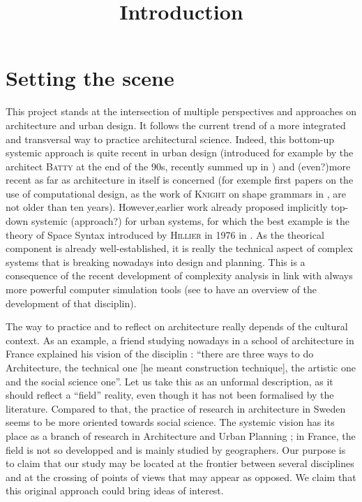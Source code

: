 \documentclass[english]{article}
\date{}
\newcommand{\noun}[1]{\textsc{#1}}
\begin{document}
\title{Introduction}

\maketitle

\section{Setting the scene}

This project stands at the intersection of multiple perspectives
and approaches on architecture and urban design. It follows 
the current trend of a more integrated and transversal way to practice
architectural science. Indeed, this bottom-up systemic approach is
quite recent in urban design (introduced for example by the architect
\noun{Batty} at the end of the 90s, recently summed up in \cite{Bat07})
and (even?)more recent as far as architecture in itself is concerned (for exemple first papers
on the use of computational design, as the work of \noun{Knight} on
shape grammars in \cite{knight2003computing}, are not older than
ten years). However,earlier work already proposed implicitly top-down
systemic (approach?) for urban systems, for which the best example is the theory
of Space Syntax introduced by \noun{Hillier} in 1976 in \cite{hillier1976space}.
As the theorical component is already well-established, it is really the technical
aspect of complex systems that is breaking nowadays into design and
planning. This is a consequence of the recent development of complexity
analysis in link with always more powerful computer
simulation tools (see \cite{chavalarias2009french} to have an overview
of the development of that disciplin).

\bigskip{}


The way to practice and to reflect on architecture really depends of the
cultural context. As an example, a friend studying nowadays in a school
of architecture in France explained his vision of the disciplin :
``there are three ways to do Architecture, the technical one {[}he
meant construction technique{]}, the artistic one and the social science
one''. Let us take this as an unformal description, as it should
reflect a ``field'' reality, even though it has not been formalised by the literature. Compared to that, the practice of research
in architecture in Sweden seems to be more oriented towards social
science. The systemic vision has its place as a branch of research
in Architecture and Urban Planning ; in France, the field is not so
developped and is mainly studied by geographers. Our purpose is to claim
that our study may be located at the frontier between several disciplines and at
the crossing of points of views that may appear as opposed. We claim that this original approach could bring ideas of interest.
\end{document}
